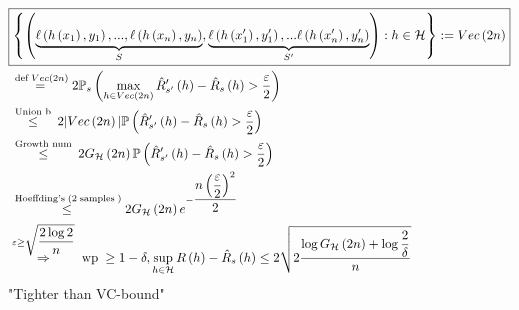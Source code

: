 \documentclass{article}
\begin{document}
\begin{align*}
&\boxed{ \left\{\left(\underbrace{\ell\left(h\left(x_{1}\right), y_{1}\right), ..., \ell\left(h\left(x_{n}\right), y_{n}\right)}_{S }, \underbrace{\ell\left(h\left(x'_{1}\right), y'_{1}\right), ... \ell\left(h\left(x'_{n}\right), y'_{n}\right)}_{S'}\right) : h \in \mathcal{H}\right\} := Vec\left(2 n\right)  }
\\ &\stackrel{\text{\;def\;} Vec\left(2 n\right) }{=} 2 \mathbb{P}_{s} \left(\displaystyle\max_{h \in Vec\left(2n\right) } \hat{R}'_{s'}\left(h\right) - \hat{R}_{s}\left(h\right) > \dfrac{\varepsilon}{2}\right)
\\ &\stackrel{\text{\;Union b\;}}{\leq} 2 | Vec\left(2 n\right)  | \mathbb{P}\left(\hat{R}'_{s'}\left(h\right) - \hat{R}_{s}\left(h\right) > \dfrac{\varepsilon}{2}\right)
\\ &\stackrel{\text{\;Growth num\;}}{\leq} 2 G_{\mathcal{H}}\left(2 n \right) \mathbb{P}\left(\hat{R}'_{s'}\left(h\right) - \hat{R}_{s}\left(h\right) > \dfrac{\varepsilon}{2}\right)
\\ &\stackrel{\text{\;Hoeffding's\;} \left(2 \text{\;samples\;}\right)}{\leq} 2 G_{\mathcal{H}}\left(2 n \right) e^{- \dfrac{n \left(\dfrac{\varepsilon}{2}\right)^{2}}{2}}
\\ &\stackrel{\varepsilon \geq  \sqrt{\dfrac{2 \log 2}{n}}}{\Rightarrow} \text{\;wp\;} \geq  1 - \delta, \displaystyle\sup_{h \in \mathcal{H}} R\left(h\right) - \hat{R}_{s}\left(h\right) \leq  2 \sqrt{2 \dfrac{\log G_{\mathcal{H}}\left(2 n \right) + \log \dfrac{2}{\delta}}{n}}
\end{align*}
"Tighter than VC-bound"
\newline \newline
\end{document}
